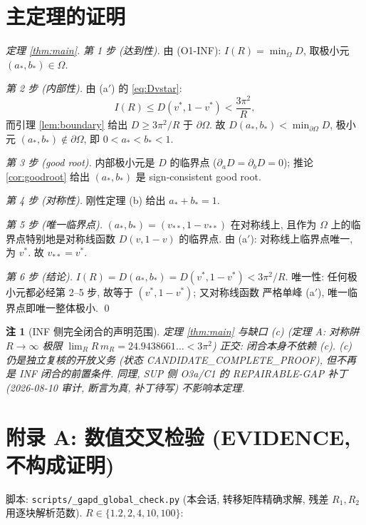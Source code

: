 \documentclass[UTF8]{ctexart}
\newtheorem{remark}[theorem]{注}
\begin{document}
\section{主定理的证明}\label{sec:proof}

\begin{proof}[定理 \ref{thm:main}]
	\emph{第 1 步 (达到性).} 由 (O1-INF): $I(R)=\min_{\Omega}D$, 取极小元
	$(a_*,b_*)\in\Omega$.

	\emph{第 2 步 (内部性).} 由 (a$'$) 的 \eqref{eq:Dvstar}:
	\begin{equation}
		I(R)\le D(v^*,1-v^*)<\frac{3\pi^2}{R},
	\end{equation}
	而引理 \ref{lem:boundary} 给出 $D\ge3\pi^2/R$ 于 $\partial\Omega$.
	故 $D(a_*,b_*)<\min_{\partial\Omega}D$, 极小元 $(a_*,b_*)\notin\partial\Omega$,
	即 $0<a_*<b_*<1$.

	\emph{第 3 步 (good root).} 内部极小元是 $D$ 的临界点
	($\partial_aD=\partial_bD=0$); 推论 \ref{cor:goodroot} 给出 $(a_*,b_*)$
	是 sign-consistent good root.

	\emph{第 4 步 (对称性).} 刚性定理 (b) 给出 $a_*+b_*=1$.

	\emph{第 5 步 (唯一临界点).} $(a_*,b_*)=(v_{**},1-v_{**})$ 在对称线上,
	且作为 $\Omega$ 上的临界点特别地是对称线函数 $D(v,1-v)$ 的临界点.
	由 (a$'$): 对称线上临界点唯一, 为 $v^*$. 故 $v_{**}=v^*$.

	\emph{第 6 步 (结论).} $I(R)=D(a_*,b_*)=D(v^*,1-v^*)<3\pi^2/R$.
	唯一性: 任何极小元都必经第 2--5 步, 故等于 $(v^*,1-v^*)$; 又对称线函数
	严格单峰 (a$'$), 唯一临界点即唯一整体极小. \qed
\end{proof}

\begin{remark}[INF 侧完全闭合的声明范围]
	定理 \ref{thm:main} 与缺口 (c) (定理 A: 对称阱 $R\to\infty$ 极限
	$\lim_R R\,m_R=24.9438661\ldots<3\pi^2$) 正交: 闭合本身不依赖 (c).
	(c) 仍是独立复核的开放义务 (状态 CANDIDATE\_COMPLETE\_PROOF), 但不再是
	INF 闭合的前置条件. 同理, SUP 侧 O3a/C1 的 REPAIRABLE-GAP 补丁
	(2026-08-10 审计, 断言为真, 补丁待写) 不影响本定理.
\end{remark}

\section{附录 A: 数值交叉检验 (EVIDENCE, 不构成证明)}\label{app:evid}

脚本: \texttt{scripts/\_gapd\_global\_check.py} (本会话, 转移矩阵精确求解,
残差 $R_1,R_2$ 用逐块解析范数). $R\in\{1.2,2,4,10,100\}$:
\end{document}
